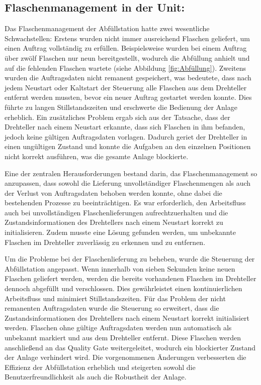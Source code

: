 \subsection{Flaschenmanagement in der Unit:}

Das Flaschenmanagement der Abfüllstation hatte zwei wesentliche Schwachstellen: Erstens wurden nicht immer ausreichend Flaschen geliefert, um einen Auftrag vollständig zu erfüllen. Beispielsweise wurden bei einem Auftrag über zwölf Flaschen nur neun bereitgestellt, wodurch die Abfüllung anhielt und auf die fehlenden Flaschen wartete (siehe Abbildung \ref{fig:Abfüllung}). Zweitens wurden die Auftragsdaten nicht remanent gespeichert, was bedeutete, dass nach jedem Neustart oder Kaltstart der Steuerung alle Flaschen aus dem Drehteller entfernt werden mussten, bevor ein neuer Auftrag gestartet werden konnte. Dies führte zu langen Stillstandszeiten und erschwerte die Bedienung der Anlage erheblich. Ein zusätzliches Problem ergab sich aus der Tatsache, dass der Drehteller nach einem Neustart erkannte, dass sich Flaschen in ihm befanden, jedoch keine gültigen Auftragsdaten vorlagen. Dadurch geriet der Drehteller in einen ungültigen Zustand und konnte die Aufgaben an den einzelnen Positionen nicht korrekt ausführen, was die gesamte Anlage blockierte.

Eine der zentralen Herausforderungen bestand darin, das Flaschenmanagement so anzupassen, dass sowohl die Lieferung unvollständiger Flaschenmengen als auch der Verlust von Auftragsdaten behoben werden konnte, ohne dabei die bestehenden Prozesse zu beeinträchtigen. Es war erforderlich, den Arbeitsfluss auch bei unvollständigen Flaschenlieferungen aufrechtzuerhalten und die Zustandsinformationen des Drehtellers nach einem Neustart korrekt zu initialisieren. Zudem musste eine Lösung gefunden werden, um unbekannte Flaschen im Drehteller zuverlässig zu erkennen und zu entfernen.

Um die Probleme bei der Flaschenlieferung zu beheben, wurde die Steuerung der Abfüllstation angepasst. Wenn innerhalb von sieben Sekunden keine neuen Flaschen geliefert werden, werden die bereits vorhandenen Flaschen im Drehteller dennoch abgefüllt und verschlossen. Dies gewährleistet einen kontinuierlichen Arbeitsfluss und minimiert Stillstandszeiten. Für das Problem der nicht remanenten Auftragsdaten wurde die Steuerung so erweitert, dass die Zustandsinformationen des Drehtellers nach einem Neustart korrekt initialisiert werden. Flaschen ohne gültige Auftragsdaten werden nun automatisch als unbekannt markiert und aus dem Drehteller entfernt. Diese Flaschen werden anschließend an das Quality Gate weitergeleitet, wodurch ein blockierter Zustand der Anlage verhindert wird. Die vorgenommenen Änderungen verbesserten die Effizienz der Abfüllstation erheblich und steigerten sowohl die Benutzerfreundlichkeit als auch die Robustheit der Anlage.

